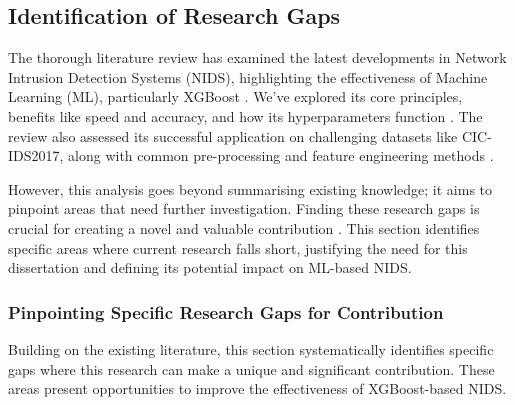 

\subsection{Identification of Research Gaps}

The thorough literature review has examined the latest developments in Network Intrusion Detection Systems (NIDS), highlighting the effectiveness of Machine Learning (ML), particularly XGBoost \parencite{aldhubaib2024network}. We've explored its core principles, benefits like speed and accuracy, and how its hyperparameters function \parencite{chen2016xgboost, habeeb2024two}. The review also assessed its successful application on challenging datasets like CIC-IDS2017, along with common pre-processing and feature engineering methods \parencite{almutairi2025intrusion, kumar2021cicids}.

However, this analysis goes beyond summarising existing knowledge; it aims to pinpoint areas that need further investigation. Finding these research gaps is crucial for creating a novel and valuable contribution \parencite{mahfouz2022systematic}. This section identifies specific areas where current research falls short, justifying the need for this dissertation and defining its potential impact on ML-based NIDS.

\subsubsection{Pinpointing Specific Research Gaps for Contribution}
Building on the existing literature, this section systematically identifies specific gaps where this research can make a unique and significant contribution. These areas present opportunities to improve the effectiveness of XGBoost-based NIDS.

